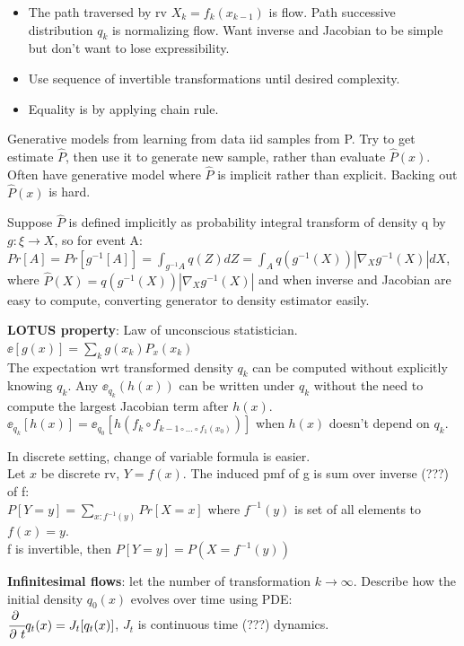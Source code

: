 \documentclass[12pt,a4paper]{article}
\begin{document}
\begin{itemize}
\item The path traversed by rv $X_k=f_k(x_{k-1})$ is flow. Path successive distribution {$q_k$} is normalizing flow. 
Want inverse and Jacobian to be simple but don't want to lose expressibility. 
\item Use sequence of invertible transformations until desired complexity. 
\item Equality is by applying chain rule. 
\end{itemize}

Generative models from learning from data iid samples from P. Try to get estimate $\hat{P}$, then use it to generate new sample, rather than evaluate $\hat{P}(x)$. Often have generative model where 
$\hat{P}$ is implicit rather than explicit. Backing out $\hat{P}(x)$ is hard. 

Suppose $\hat{P}$ is defined implicitly as probability integral transform of density q by $g: \xi\rightarrow X$, so for event A: \\
$Pr[A]=Pr[g^{-1}[A]]=\int_{g^{-1}{A}}q(Z)dZ=\int_A q(g^{-1}(X))|\nabla_Xg^{-1}(X)|dX$, \\
where $\hat{P}(X)=q(g^{-1}(X))|\nabla_Xg^{-1}(X)|$ and when inverse and Jacobian are easy to compute, converting generator to density estimator easily. 

\vspace{0.5cm}
\textbf{LOTUS property}: Law of unconscious statistician.\\
$\ee[g(x)]=\sum_k g(x_k)P_x(x_k)$\\
The expectation wrt transformed density $q_k$ can be computed without explicitly knowing $q_k$. Any $\ee_{q_k}(h(x))$ can be written under $q_k$ without the need to compute the largest Jacobian term after $h(x)$.\\ 
$\ee_{q_k}[h(x)]=\ee_{q_0}[h(f_k\circ f_{k-1\circ ... \circ f_1(x_0)})]$ when $h(x)$ doesn't depend on $q_k$.

\vspace{0.5cm}
In discrete setting, change of variable formula is easier. \\
Let $x$ be discrete rv, $Y=f(x)$. The induced pmf of g is sum over inverse (???) of f:\\
$P[Y=y]=\sum_{x: f^{-1}(y)}Pr[X=x]$ where $f^{-1}(y)$ is set of all elements to $f(x)=y$. \\
f is invertible, then $P[Y=y]=P(X=f^{-1}(y))$

\vspace{0.5cm}
\textbf{Infinitesimal flows}: let the number of transformation $k\rightarrow \infty$. Describe how the initial density $q_0(x)$ evolves over time using PDE:\\
$\cfrac{\partial\ }{\partial\ t}q_t(x)=J_t[q_t(x)]$, $J_t$ is continuous time (???) dynamics. 
\end{document}
